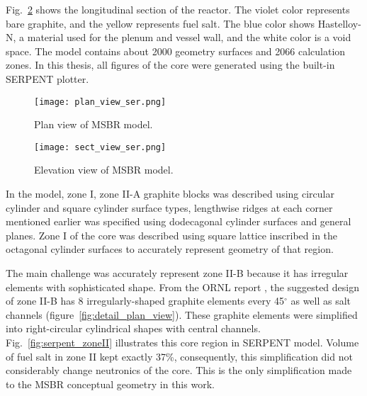 Fig.~\ref{fig:serpent_sectional_view} shows the longitudinal section of the reactor. The violet color represents bare graphite, and the yellow represents fuel salt. The blue color shows Hastelloy-N, a material used for the plenum and vessel wall, and the white color is a void space. The model contains about 2000 geometry surfaces and 2066 calculation zones. In this thesis, all figures of the core were generated using the built-in SERPENT plotter.

\begin{figure}[hbp!] %
  \centering
  \vspace{-0.3em}
  \texttt{[image: plan\_view\_ser.png]}
  \caption{Plan view of \gls{MSBR} model.}
  \vspace{-0.6em}
  \label{fig:serpent_plan_view}
\end{figure}
\FloatBarrier

\begin{figure}[hbp!] %
  \centering
  \vspace{-0.3em}
  \texttt{[image: sect\_view\_ser.png]}
  \caption{Elevation view of \gls{MSBR} model.}
  \vspace{-0.6em}
  \label{fig:serpent_sectional_view}
\end{figure}
\FloatBarrier

In the model, zone I, zone II-A graphite blocks was described using circular cylinder and square cylinder surface types, lengthwise ridges at each corner mentioned earlier was specified using dodecagonal cylinder surfaces and general planes. Zone I of the core was described using square lattice inscribed in the octagonal cylinder surfaces to accurately represent geometry of that region.

The main challenge was accurately represent zone II-B because it has irregular elements with sophisticated shape. From the ORNL report \cite{robertson_conceptual_1971}, the suggested design of zone II-B has 8 irregularly-shaped graphite elements every 45$^\circ$ as well as salt channels (figure~\ref{fig:detail_plan_view}). These graphite elements were simplified into right-circular cylindrical shapes  with central channels. Fig.~\ref{fig:serpent_zoneII} illustrates this core region in SERPENT model. Volume of fuel salt in zone II kept exactly 37\%, consequently, this simplification did not considerably change neutronics of the core. This is the only simplification made to the \gls{MSBR} conceptual geometry in this work. 

